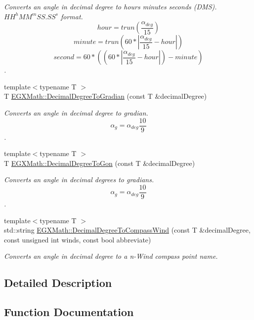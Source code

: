 \begin{DoxyCompactItemize}
\begin{DoxyCompactList}\small\item\em Converts an angle in decimal degree to hours minutes seconds (D\+MS). ${HH}^{h}{MM}^{m}{SS.SS}^{s}$ format. \[hour=trun(\frac{\alpha_{deg}}{15})\] \[minute=trun(60 * |\frac{\alpha_{deg}}{15} - hour|)\] \[second=60 * ((60 * |\frac{\alpha_{deg}}{15} - hour|)-minute)\]. \end{DoxyCompactList}\item 
{\footnotesize template$<$typename T $>$ }\\T \mbox{\hyperlink{group___e_g_x_math-_angle_conversions-_decimal_degree_ga3ac6f1ceb36a4938cdf3b55554734c99}{E\+G\+X\+Math\+::\+Decimal\+Degree\+To\+Gradian}} (const T \&decimal\+Degree)
\begin{DoxyCompactList}\small\item\em Converts an angle in decimal degree to gradian. \[\alpha_{g}=\alpha_{deg}\frac{10}{9}\]. \end{DoxyCompactList}\item 
{\footnotesize template$<$typename T $>$ }\\T \mbox{\hyperlink{group___e_g_x_math-_angle_conversions-_decimal_degree_gaeb333a1ad0aeb913c025fbd1be85fcb3}{E\+G\+X\+Math\+::\+Decimal\+Degree\+To\+Gon}} (const T \&decimal\+Degree)
\begin{DoxyCompactList}\small\item\em Converts an angle in decimal degrees to gradians. \[\alpha_{g}=\alpha_{deg}\frac{10}{9}\]. \end{DoxyCompactList}\item 
{\footnotesize template$<$typename T $>$ }\\std\+::string \mbox{\hyperlink{group___e_g_x_math-_angle_conversions-_decimal_degree_ga415a94651a2b2397b7f2bda90a19ee2c}{E\+G\+X\+Math\+::\+Decimal\+Degree\+To\+Compass\+Wind}} (const T \&decimal\+Degree, const unsigned int winds, const bool abbreviate)
\begin{DoxyCompactList}\small\item\em Converts an angle in decimal degree to a n-\/\+Wind compass point name. \end{DoxyCompactList}\end{DoxyCompactItemize}


\subsection{Detailed Description}


\subsection{Function Documentation}
\mbox{\label{group___e_g_x_math-_angle_conversions-_decimal_degree_gacdd463fcabffeb598ebda65b012ce743}} 
